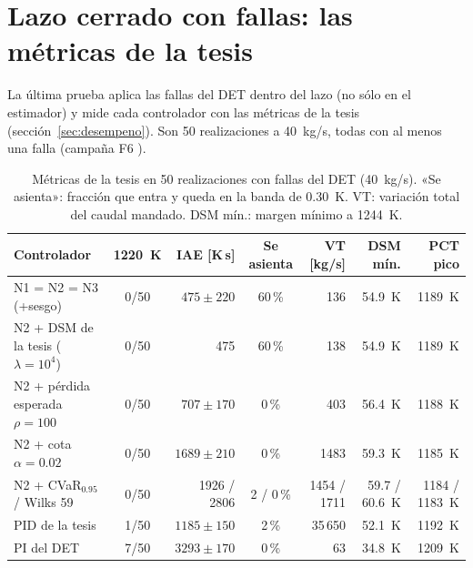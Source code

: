 
\section{Lazo cerrado con fallas: las métricas de la tesis}\label{sec:riesgo-fallas}
La última prueba aplica las fallas del DET dentro del lazo (no sólo en el estimador) y mide cada
controlador con las métricas de la tesis (sección~\ref{sec:desempeno}). Son 50 realizaciones a
40~kg/s, todas con al menos una falla (campaña F6 ).

\begin{table}[H]\centering\small\setlength{\tabcolsep}{3pt}
\begin{tabularx}{\linewidth}{@{}Y c r c r r r@{}}\toprule
Controlador & 1220~K & IAE [K\,s] & Se asienta & VT [kg/s] & DSM mín. & PCT pico\\\midrule
N1 = N2 = N3 (+sesgo) & 0/50 & $475\pm220$ & 60\,\% & 136 & 54.9~K & 1189~K\\
N2 + DSM de la tesis ($\lambda=10^4$) & 0/50 & 475 & 60\,\% & 138 & 54.9~K & 1189~K\\
N2 + pérdida esperada $\rho=100$ & 0/50 & $707\pm170$ & 0\,\% & 403 & 56.4~K & 1188~K\\
N2 + cota $\alpha=0.02$ & 0/50 & $1689\pm210$ & 0\,\% & 1483 & 59.3~K & 1185~K\\
N2 + CVaR$_{0.95}$ / Wilks 59 & 0/50 & 1926 / 2806 & 2 / 0\,\% & 1454 / 1711 & 59.7 / 60.6~K & 1184 / 1183~K\\
PID de la tesis & 1/50 & $1185\pm150$ & 2\,\% & 35\,650 & 52.1~K & 1192~K\\
PI del DET & 7/50 & $3293\pm170$ & 0\,\% & 63 & 34.8~K & 1209~K\\\bottomrule
\end{tabularx}
\caption{Métricas de la tesis en 50 realizaciones con fallas del DET (40~kg/s). «Se asienta»:
fracción que entra y queda en la banda de 0.30~K. VT: variación total del caudal mandado. DSM
mín.: margen mínimo a 1244~K.}
\label{tab:det-tesis}
\end{table}


